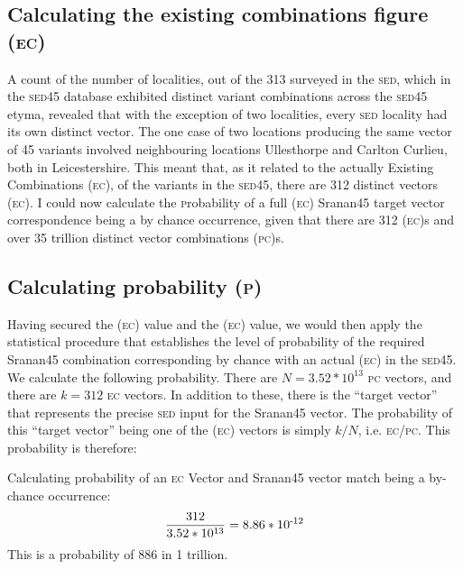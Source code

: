 \subsection{Calculating the existing combinations figure (\textsc{ec})} \label{4.1.2}
A count of the number of localities, out of the 313 surveyed in the \textsc{sed}, which in the \textsc{sed45} database exhibited distinct variant combinations across the \textsc{sed45} etyma, revealed that with the exception of two localities, every \textsc{sed} locality had its own distinct vector. The one case of two locations producing the same vector of 45 variants involved neighbouring locations Ullesthorpe and Carlton Curlieu, both in Leicestershire. This meant that, as it related to the actually Existing Combinations (\textsc{ec}), of the variants in the \textsc{sed45}, there are 312 distinct vectors (\textsc{ec}). I could now calculate the \textsc{p}robability of a full (\textsc{ec}) Sranan45 target vector correspondence being a by chance occurrence, given that there are 312 (\textsc{ec})s and over 35 trillion distinct vector combinations (\textsc{pc})s.

\subsection{Calculating probability (\textsc{p})} \label{4.1.3}
Having secured the (\textsc{ec}) value and the (\textsc{ec}) value, we would then apply the statistical procedure that establishes the level of probability of the required Sranan45 combination corresponding by chance with an actual (\textsc{ec}) in the \textsc{sed45}. We calculate the following probability. There are $N = 3.52 \ast 10^{13}$ \textsc{pc} vectors, and there are $k = 312$ \textsc{ec} vectors. In addition to these, there is the ``target vector'' that represents the precise \textsc{sed} input for the Sranan45 vector. The probability of this ``target vector'' being one of the (\textsc{ec}) vectors is simply $k/N$, i.e. \textsc{ec}/\textsc{pc}. This probability is therefore:

\ea
\label{exTable 4.2}
{Calculating probability of an \textsc{ec} Vector and Sranan45 vector match being a by-chance occurrence}:\\
\[\frac{312}{3.52 \ast 10^{13}}  =   8.86 \ast 10\textsuperscript{-12} \]
This is a probability of 886 in 1 trillion.
\z


